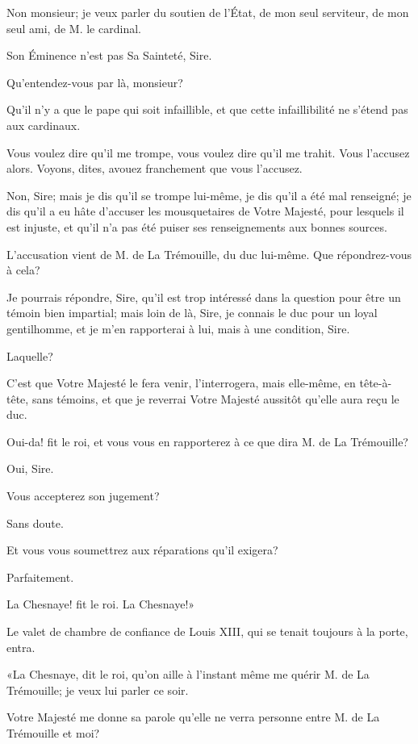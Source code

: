 \speak  Non monsieur; je veux parler du soutien de l'État, de mon seul serviteur, de mon seul ami, de M. le cardinal. 

\speak  Son Éminence n'est pas Sa Sainteté, Sire. 

\speak  Qu'entendez-vous par là, monsieur? 

\speak  Qu'il n'y a que le pape qui soit infaillible, et que cette infaillibilité ne s'étend pas aux cardinaux. 

\speak  Vous voulez dire qu'il me trompe, vous voulez dire qu'il me trahit. Vous l'accusez alors. Voyons, dites, avouez franchement que vous l'accusez. 

\speak  Non, Sire; mais je dis qu'il se trompe lui-même, je dis qu'il a été mal renseigné; je dis qu'il a eu hâte d'accuser les mousquetaires de Votre Majesté, pour lesquels il est injuste, et qu'il n'a pas été puiser ses renseignements aux bonnes sources. 

\speak  L'accusation vient de M. de La Trémouille, du duc lui-même. Que répondrez-vous à cela? 

\speak  Je pourrais répondre, Sire, qu'il est trop intéressé dans la question pour être un témoin bien impartial; mais loin de là, Sire, je connais le duc pour un loyal gentilhomme, et je m'en rapporterai à lui, mais à une condition, Sire. 

\speak  Laquelle? 

\speak  C'est que Votre Majesté le fera venir, l'interrogera, mais elle-même, en tête-à-tête, sans témoins, et que je reverrai Votre Majesté aussitôt qu'elle aura reçu le duc. 

\speak  Oui-da! fit le roi, et vous vous en rapporterez à ce que dira M. de La Trémouille? 

\speak  Oui, Sire. 

\speak  Vous accepterez son jugement? 

\speak  Sans doute. 

\speak  Et vous vous soumettrez aux réparations qu'il exigera? 

\speak  Parfaitement. 

\speak  La Chesnaye! fit le roi. La Chesnaye!» 

Le valet de chambre de confiance de Louis XIII, qui se tenait toujours à la porte, entra. 

«La Chesnaye, dit le roi, qu'on aille à l'instant même me quérir M. de La Trémouille; je veux lui parler ce soir. 

\speak  Votre Majesté me donne sa parole qu'elle ne verra personne entre M. de La Trémouille et moi? 

